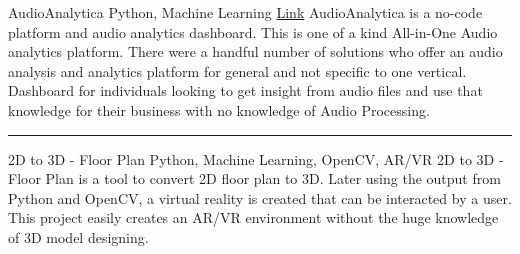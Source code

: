 \begin{cventries}
	\cventry
	{}
	{AudioAnalytica}
	{Python, Machine Learning}
	{\href{https://github.com/rehanguha/AudioAnalytica}{\faLink Link}}
	{AudioAnalytica is a no-code platform and audio analytics dashboard.
	This is one of a kind All-in-One Audio analytics platform.
	There were a handful number of solutions who offer an audio analysis and analytics platform for general and not specific to one vertical.
	Dashboard for individuals looking to get insight from audio files and use that knowledge for their business with no knowledge of Audio Processing.
	}

	\begin{center}
		\rule{30mm}{.1mm}
	\end{center}

	\cventry
	{}
	{2D to 3D - Floor Plan}
	{Python, Machine Learning, OpenCV, AR/VR}
	{}
	{2D to 3D - Floor Plan is a tool to convert 2D floor plan to 3D. Later using the output from Python and OpenCV, a virtual reality is created
	that can be interacted by a user. This project easily creates an AR/VR environment without the huge knowledge of 3D model designing.}

	\vspace{5mm}
\end{cventries}